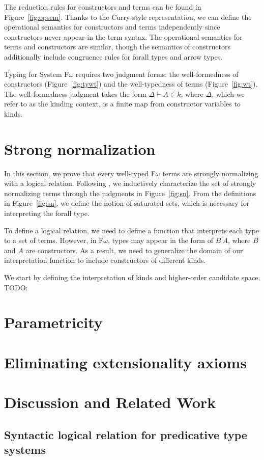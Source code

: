\documentclass[acmsmall, nonacm=true]{acmart}
\begin{document}
The reduction rules for constructors and terms can be found in
Figure~\ref{fig:opsem}. Thanks to the Curry-style representation, we
can define the operational semantics for constructors and terms
independently since constructors never appear in the term syntax. The
operational semantics for terms and constructors are similar, though
the semantics of constructors additionally include congruence rules
for forall types and arrow types.

Typing for System F$\omega$ requires two judgment forms: the
well-formedness of constructors (Figure~\ref{fig:tywt}) and the
well-typedness of terms (Figure~\ref{fig:wt}).
The well-formedness judgment takes the form $\Delta \vdash A \in k$,
where $\Delta$, which we refer to as the kinding context, is a finite
map from constructor variables to kinds.

\section{Strong normalization}
In this section, we prove that every well-typed F$\omega$ terms are
strongly normalizing with a logical relation. Following
\citet{abel:poplmark}, we inductively characterize the set of strongly
normalizing terms through the judgments in Figure~\ref{fig:sn}. From
the definitions in Figure~\ref{fig:sn}, we define the notion of
saturated sets, which is necessary for interpreting the forall type.


To define a logical relation, we need to define a function that
interprets each type to a set of terms. However, in F$\omega$, types
may appear in the form of $B\ A$, where $B$ and $A$ are
constructors. As a result, we need to generalize the domain of our
interpretation function to include constructors of different kinds.

We start by defining the interpretation of kinds and higher-order
candidate space.
TODO:







\section{Parametricity}


\section{Eliminating extensionality axioms}

\section{Discussion and Related Work}

\subsection{Syntactic logical relation for predicative type systems}
\end{document}
